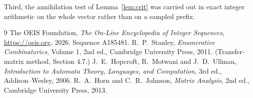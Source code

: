 \documentclass[11pt,a4paper]{article}
\theoremstyle{plain}
\theoremstyle{definition}
\begin{document}
Third, the annihilation test of Lemma~\ref{lem:crit} was carried out in exact integer
arithmetic on the whole vector rather than on a sampled prefix.

\begin{thebibliography}{9}
 The OEIS Foundation, \emph{The On-Line Encyclopedia of Integer
Sequences}, \url{https://oeis.org}, 2026. Sequence A185481.
 R.~P.~Stanley, \emph{Enumerative Combinatorics}, Volume 1, 2nd ed.,
Cambridge University Press, 2011. (Transfer-matrix method, Section 4.7.)
 J.~E.~Hopcroft, R.~Motwani and J.~D.~Ullman, \emph{Introduction to Automata
Theory, Languages, and Computation}, 3rd ed., Addison--Wesley, 2006.
 R.~A.~Horn and C.~R.~Johnson, \emph{Matrix Analysis}, 2nd ed., Cambridge
University Press, 2013.
\end{thebibliography}
\end{document}
